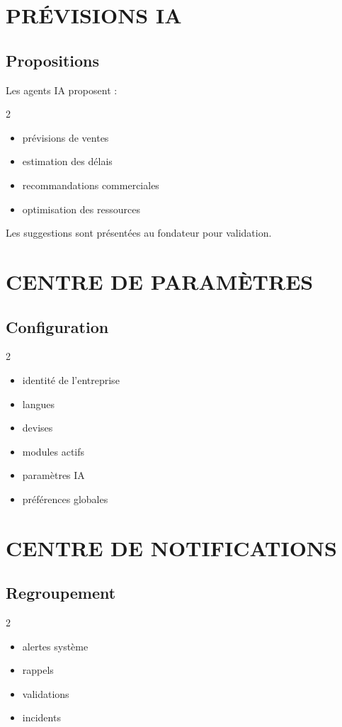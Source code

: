 \documentclass[12pt,a4paper,oneside]{book}
\begin{document}
\chapter{PRÉVISIONS IA}

\section{Propositions}
Les agents IA proposent :
\begin{multicols}{2}
\begin{itemize}
\item prévisions de ventes
\item estimation des délais
\item recommandations commerciales
\item optimisation des ressources
\end{itemize}
\end{multicols}

Les suggestions sont présentées au fondateur pour validation.

\chapter{CENTRE DE PARAMÈTRES}

\section{Configuration}
\begin{multicols}{2}
\begin{itemize}
\item identité de l'entreprise
\item langues
\item devises
\item modules actifs
\item paramètres IA
\item préférences globales
\end{itemize}
\end{multicols}

\chapter{CENTRE DE NOTIFICATIONS}

\section{Regroupement}
\begin{multicols}{2}
\begin{itemize}
\item alertes système
\item rappels
\item validations
\item incidents
\end{itemize}
\end{multicols}
\end{document}
